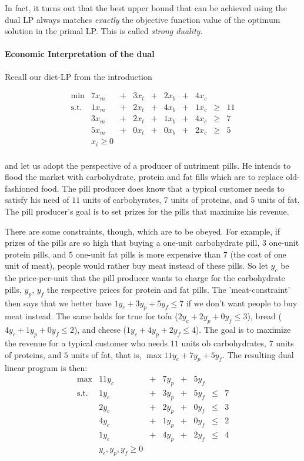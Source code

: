 \documentclass{article}
\begin{document}
In fact, it turns out that the best upper bound that can be achieved using the dual LP always matches \emph{exactly} the objective function value of the optimum solution in the primal LP. This is called \emph{strong duality}.

\paragraph*{Economic Interpretation of the dual}
Recall our diet-LP from the introduction

\[
\begin{matrix}
	\min	& 7 x_m	&+& 3 x_t&+& 2 x_b&+&4 x_c&&\\  
	\mbox{s.t.}	& 1 x_m &+& 2 x_t&+& 4 x_b&+&1 x_c&\geq&11\\
			& 3 x_m &+& 2 x_t&+& 1 x_b&+&4 x_c&\geq& 7\\
	           	& 5 x_m &+& 0 x_t&+& 0 x_b&+&2 x_c&\geq& 5\\
			& x_i\geq 0\\
\end{matrix}
\]

and let us adopt the perspective of a producer of nutriment pills. He intends to flood the market with carbohydrate, protein and fat fills which are to replace old-fashioned food. The pill producer does know that a typical customer needs to satisfy his need of $11$ units of carbohyrates, $7$ units of proteins, and $5$ units of fat. The pill producer's goal is to set prizes for the pills that maximize his revenue.

There are some constraints, though, which are to be obeyed. For example, if prizes of the pills are so high that buying a one-unit carbohydrate pill, $3$ one-unit protein pills, and $5$ one-unit fat pills is more expensive than $7$ (the cost of one unit of meat), people would rather buy meat instead of these pills.
So let $y_c$ be the price-per-unit that the pill producer wants to charge for the carbohydrate pills, $y_p$, $y_f$ the respective prices for protein and fat pills. The 'meat-constraint' then says that we better have $1 y_c +  3 y_p + 5 y_f \leq 7$ if we don't want people to buy meat instead.
The same holds for true for tofu ($2 y_c + 2 y_p + 0 y_f \leq 3$), bread ($4y_c + 1 y_p +0y_f \leq 2$), and cheese ($1y_c+4y_p+2y_f\leq 4$). The goal is to maximize the revenue for a typical customer who needs $11$ units ob carbohydrates, $7$ units of proteins, and $5$ units of fat, that is, $\max 11y_c + 7y_p +5y_f$. The resulting dual linear program is then:
\[
\begin{matrix}
	\max	& 11 y_c	&+& 7 y_p&+& 5 y_f&&\\  
	\mbox{s.t.}	& 1 y_c &+& 3 y_p&+& 5 y_f&\leq&7\\
			&2 y_c &+& 2 y_p &+& 0 y_f & \leq &3\\
			&4 y_c &+& 1 y_p &+& 0 y_f & \leq &2\\
			&1 y_c &+& 4 y_p &+& 2 y_f & \leq &4\\
			& y_c, y_p, y_f\geq 0\\
\end{matrix}
\]
\end{document}
